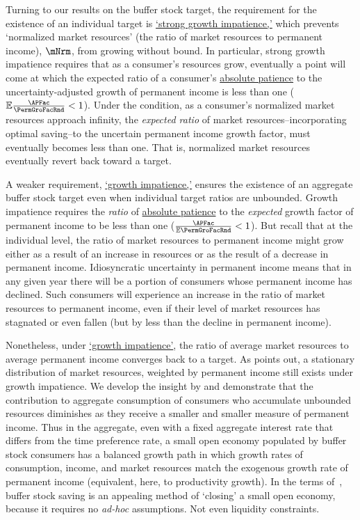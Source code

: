 \documentclass[BufferStockTheory]{subfiles}
\begin{document}
Turning to our results on the buffer stock target, the requirement for the existence of an individual target is \hyperlink{GICMod}{`strong growth impatience,'} which prevents `normalized market resources' (the ratio of market resources to permanent income), $\mNrm$, from growing without bound.
In particular, strong growth impatience requires that as a consumer's resources grow, eventually a point will come at which the expected ratio of a consumer's \hyperlink{APFAC}{absolute patience} to the uncertainty-adjusted growth of permanent income is less than one ($\mathbb{E}\frac{\APFac}{\PermGroFacRnd}<1$).
Under the condition, as a consumer's normalized market resources approach infinity, the \textit{expected ratio} of market resources--incorporating optimal saving--to the uncertain permanent income growth factor, must eventually becomes less than one.
That is, normalized market resources eventually revert back toward a target.

A weaker requirement, \hyperlink{GIC}{`growth impatience,'} ensures the existence of an aggregate buffer stock target even when individual target ratios are unbounded.
Growth impatience requires the \textit{ratio} of \hyperlink{APFacDefn}{absolute patience} to the \textit{expected} growth factor of permanent income to be less than one ($\frac{\APFac}{\mathbb{E}\PermGroFacRnd}<1$).
But recall that at the individual level, the ratio of market resources to permanent income might grow either as a result of an increase in resources or as the result of a decrease in permanent income.
Idiosyncratic uncertainty in permanent income means that in any given year there will be a portion of consumers whose permanent income has declined.
Such consumers will experience an increase  in the ratio of market resources to permanent income, even if their level of market resources  has stagnated or even fallen (but by less than the decline in permanent income).

Nonetheless, under \hyperlink{GIC}{`growth impatience'}, the ratio of average market resources to average permanent income converges back to a target.
As \cite{harmenbergInvariant} points out, a stationary distribution of market resources, weighted by permanent income still exists under growth impatience.
We develop the insight by \cite{harmenbergInvariant} and demonstrate that the contribution to aggregate consumption of consumers who accumulate unbounded resources diminishes as they receive a smaller and smaller measure of permanent income.
Thus in the aggregate, even with a fixed aggregate interest rate that differs from the time preference rate, a small open economy populated by buffer stock consumers has a balanced growth path in which growth rates of consumption, income, and market resources match the exogenous growth rate of permanent income (equivalent, here, to productivity growth).
In the terms of~\cite{schmitt2003closing}, buffer stock saving is an appealing method of `closing' a small open economy, because it requires no \textit{ad-hoc} assumptions.
Not even liquidity constraints.
\end{document}
